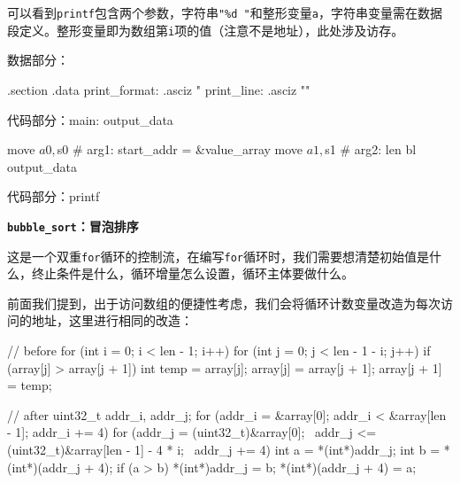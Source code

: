 可以看到\texttt{printf}包含两个参数，字符串\texttt{"\%d\ "}和整形变量\texttt{a}，字符串变量需在数据段定义。整形变量即为数组第\texttt{i}项的值（注意不是地址），此处涉及访存。

数据部分：

\begin{CodeBlock}[language=BookLoongArch]
.section .data
print_format: .asciz "%
print_line: .asciz "\n"
\end{CodeBlock}

代码部分：main: output\_data

\begin{CodeBlock}[language=BookLoongArch]
		move        $a0, $s0            # arg1: start_addr = &value_array
    move        $a1, $s1            # arg2: len
    bl          output_data
\end{CodeBlock}

代码部分：printf


\textbf{\texttt{bubble\_sort}：冒泡排序}

这是一个双重\texttt{for}循环的控制流，在编写\texttt{for}循环时，我们需要想清楚初始值是什么，终止条件是什么，循环增量怎么设置，循环主体要做什么。

前面我们提到，出于访问数组的便捷性考虑，我们会将循环计数变量改造为每次访问的地址，这里进行相同的改造：

\begin{CodeBlock}[language=BookC]
// before
for (int i = 0; i < len - 1; i++) {
  for (int j = 0; j < len - 1 - i; j++) {
    if (array[j] > array[j + 1]) {
      int temp = array[j];
      array[j] = array[j + 1];
      array[j + 1] = temp;
    }
  }
}

// after
uint32_t addr_i, addr_j;
for (addr_i = &array[0]; addr_i < &array[len - 1]; addr_i += 4) {
  for (addr_j = (uint32_t)&array[0]; \
       addr_j <= (uint32_t)&array[len - 1] - 4 * i; \
       addr_j += 4) {
    int a = *(int*)addr_j;
    int b = *(int*)(addr_j + 4);
    if (a > b) {
      *(int*)addr_j = b;
      *(int*)(addr_j + 4) = a;
    }
  }
}
\end{CodeBlock}

